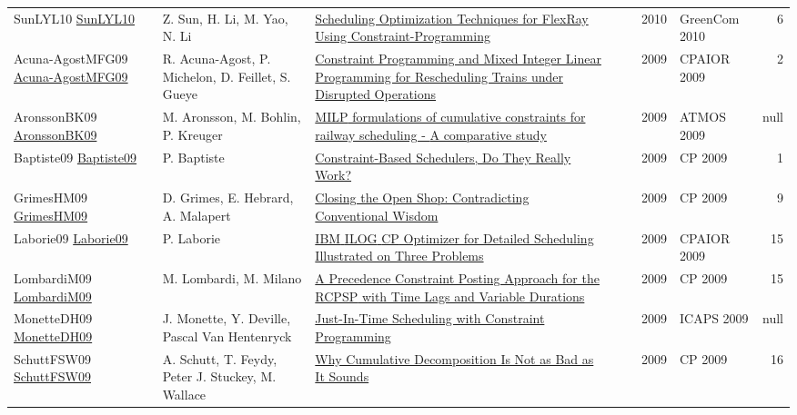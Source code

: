 {\begin{longtable}{p{3cm}p{6cm}p{7cm}rrrp{3cm}r}
SunLYL10 \href{https://doi.org/10.1109/GreenCom-CPSCom.2010.111}{SunLYL10} & Z. Sun, H. Li, M. Yao, N. Li & \href{papers/SunLYL10.pdf}{Scheduling Optimization Techniques for FlexRay Using Constraint-Programming} &  & \cite{SunLYL10} & 2010 & GreenCom 2010 & 6\\
Acuna-AgostMFG09 \href{https://doi.org/10.1007/978-3-642-01929-6\_24}{Acuna-AgostMFG09} & R. Acuna{-}Agost, P. Michelon, D. Feillet, S. Gueye & \href{papers/Acuna-AgostMFG09.pdf}{Constraint Programming and Mixed Integer Linear Programming for Rescheduling Trains under Disrupted Operations} &  & \cite{Acuna-AgostMFG09} & 2009 & CPAIOR 2009 & 2\\
AronssonBK09 \href{http://drops.dagstuhl.de/opus/volltexte/2009/2141}{AronssonBK09} & M. Aronsson, M. Bohlin, P. Kreuger & \href{papers/AronssonBK09.pdf}{{MILP} formulations of cumulative constraints for railway scheduling - {A} comparative study} &  & \cite{AronssonBK09} & 2009 & ATMOS 2009 & null\\
Baptiste09 \href{https://doi.org/10.1007/978-3-642-04244-7\_1}{Baptiste09} & P. Baptiste & \href{papers/Baptiste09.pdf}{Constraint-Based Schedulers, Do They Really Work?} &  & \cite{Baptiste09} & 2009 & CP 2009 & 1\\
GrimesHM09 \href{https://doi.org/10.1007/978-3-642-04244-7\_33}{GrimesHM09} & D. Grimes, E. Hebrard, A. Malapert & \href{papers/GrimesHM09.pdf}{Closing the Open Shop: Contradicting Conventional Wisdom} &  & \cite{GrimesHM09} & 2009 & CP 2009 & 9\\
Laborie09 \href{https://doi.org/10.1007/978-3-642-01929-6\_12}{Laborie09} & P. Laborie & \href{papers/Laborie09.pdf}{{IBM} {ILOG} {CP} Optimizer for Detailed Scheduling Illustrated on Three Problems} &  & \cite{Laborie09} & 2009 & CPAIOR 2009 & 15\\
LombardiM09 \href{https://doi.org/10.1007/978-3-642-04244-7\_45}{LombardiM09} & M. Lombardi, M. Milano & \href{papers/LombardiM09.pdf}{A Precedence Constraint Posting Approach for the {RCPSP} with Time Lags and Variable Durations} &  & \cite{LombardiM09} & 2009 & CP 2009 & 15\\
MonetteDH09 \href{http://aaai.org/ocs/index.php/ICAPS/ICAPS09/paper/view/712}{MonetteDH09} & J. Monette, Y. Deville, Pascal Van Hentenryck & \href{papers/MonetteDH09.pdf}{Just-In-Time Scheduling with Constraint Programming} &  & \cite{MonetteDH09} & 2009 & ICAPS 2009 & null\\
SchuttFSW09 \href{https://doi.org/10.1007/978-3-642-04244-7\_58}{SchuttFSW09} & A. Schutt, T. Feydy, Peter J. Stuckey, M. Wallace & \href{papers/SchuttFSW09.pdf}{Why Cumulative Decomposition Is Not as Bad as It Sounds} &  & \cite{SchuttFSW09} & 2009 & CP 2009 & 16\\

\end{longtable}}
